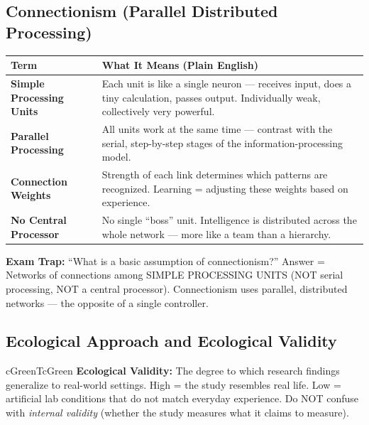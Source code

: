 \documentclass[11pt,a4paper]{article}
\newcommand{\bb}[1]{\textbf{#1}}
\begin{document}
\subsection*{Connectionism (Parallel Distributed Processing)}

\begin{center}
\renewcommand{\arraystretch}{1.4}
\begin{tabular}{|L{3cm}|L{12.2cm}|}
\hline
{}\color{white}\bb{Term} & \color{white}\bb{What It Means (Plain English)} \\
\hline
\bb{Simple Processing Units} & Each unit is like a single neuron --- receives input, does a tiny calculation, passes output. Individually weak, collectively very powerful. \\
\bb{Parallel Processing} & All units work at the same time --- contrast with the serial, step-by-step stages of the information-processing model. \\
\bb{Connection Weights} & Strength of each link determines which patterns are recognized. Learning = adjusting these weights based on experience. \\
\bb{No Central Processor} & No single ``boss'' unit. Intelligence is distributed across the whole network --- more like a team than a hierarchy. \\
\hline
\end{tabular}
\end{center}

\begin{warnbox}
\bb{Exam Trap:} ``What is a basic assumption of connectionism?'' Answer = Networks of connections among SIMPLE PROCESSING UNITS (NOT serial processing, NOT a central processor). Connectionism uses parallel, distributed networks --- the opposite of a single controller.
\end{warnbox}

\subsection*{Ecological Approach and Ecological Validity}

\begin{hintbox}{cGreenT}{cGreen}
\bb{Ecological Validity:} The degree to which research findings generalize to real-world settings. High = the study resembles real life. Low = artificial lab conditions that do not match everyday experience. Do NOT confuse with \textit{internal validity} (whether the study measures what it claims to measure).
\end{hintbox}
\end{document}
